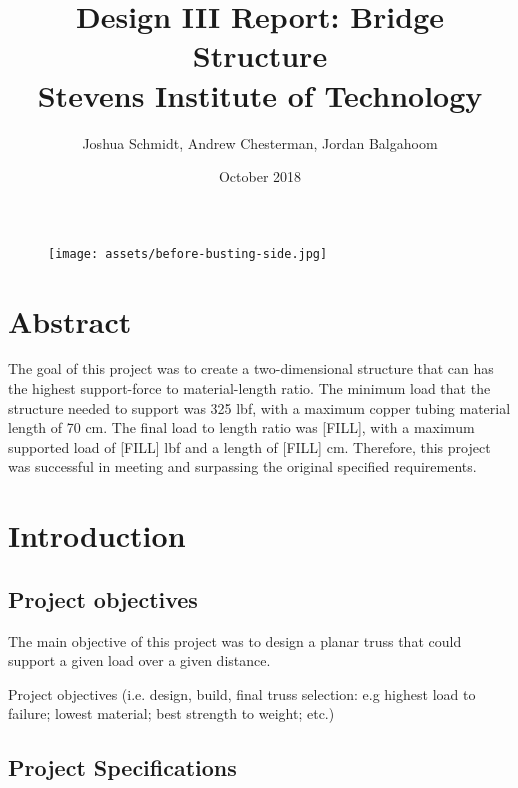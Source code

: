 \documentclass{article}
\title{%
    Design III Report: Bridge Structure \\
    \large Stevens Institute of Technology}
\date{October 2018}
\author{Joshua Schmidt, Andrew Chesterman, Jordan Balgahoom}
\let\Oldsection\section
\renewcommand{\section}{\FloatBarrier\Oldsection}
\let\Oldsubsection\subsection
\renewcommand{\subsection}{\FloatBarrier\Oldsubsection}
\begin{document}
  
  \maketitle
  
  \bigskip
  \bigskip
  \bigskip
  \bigskip
  
  \begin{figure}[!htb]
    \centering
    \texttt{[image: assets/before-busting-side.jpg]}
    \label{fig:logo}
  \end{figure}
  
  \newpage
  
  \tableofcontents
  
  \newpage
  
  
  \section{Abstract}
  
  The goal of this project was to create a two-dimensional structure that can has the highest support-force to material-length ratio. The minimum load that the structure needed to support was 325 lbf, with a maximum copper tubing material length of 70 cm. The final load to length ratio was [FILL], with a maximum supported load of [FILL] lbf and a length of [FILL] cm. Therefore, this project was successful in meeting and surpassing the original specified requirements.
  
  \newpage
  
  \section{Introduction}
  
  \subsection{Project objectives}
  
  The main objective of this project was to design a planar truss that could support a given load over a given distance.
  
  Project objectives (i.e. design, build, final truss selection: e.g highest load to failure; lowest material; best strength to weight; etc.)
  
  \subsection{Project Specifications}
  
\end{document}
